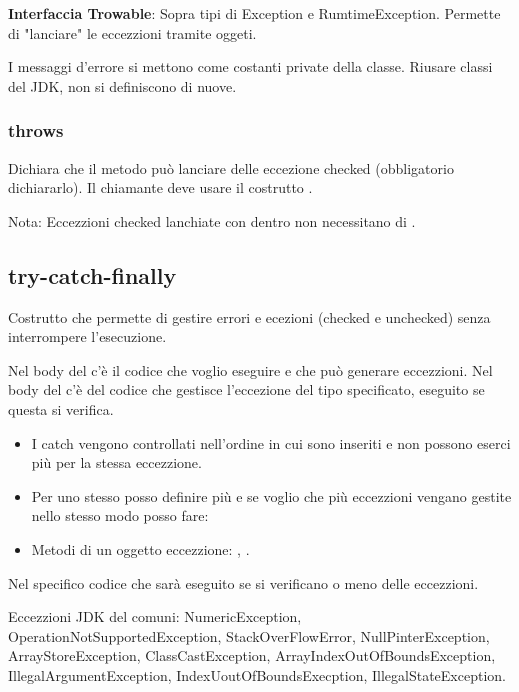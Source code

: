 \medskip

\textbf{Interfaccia Trowable}: Sopra tipi di Exception e RumtimeException. Permette di "lanciare" le eccezzioni tramite oggeti.

\medskip

I messaggi d'errore si mettono come costanti private della classe.
Riusare classi del JDK, non si definiscono di nuove.

\subsubsection{throws}
Dichiara che il metodo può lanciare delle eccezione checked (obbligatorio dichiararlo). Il chiamante deve usare il costrutto .


Nota: Eccezzioni checked lanchiate con  dentro  non necessitano di .

\subsection{try-catch-finally}
Costrutto che permette di gestire errori e ecezioni (checked e unchecked) senza interrompere l'esecuzione.


Nel body del  c'è il codice che voglio eseguire e che può generare eccezzioni. Nel body del  c'è del codice che gestisce l'eccezione del tipo specificato, eseguito se questa si verifica.

\begin{itemize}
	\item I catch vengono controllati nell'ordine in cui sono inseriti e non possono eserci più  per la stessa eccezzione.

	\item Per uno stesso  posso definire più  e se voglio che più eccezzioni vengano gestite nello stesso modo posso fare:


	\item Metodi di un oggetto eccezzione: , .
\end{itemize}

Nel  specifico codice che sarà eseguito se si verificano o meno delle eccezzioni.

\bigskip

Eccezzioni JDK del  comuni: NumericException, OperationNotSupportedException, StackOverFlowError, NullPinterException, ArrayStoreException, ClassCastException, ArrayIndexOutOfBoundsException, IllegalArgumentException, IndexUoutOfBoundsExecption, IllegalStateException.
